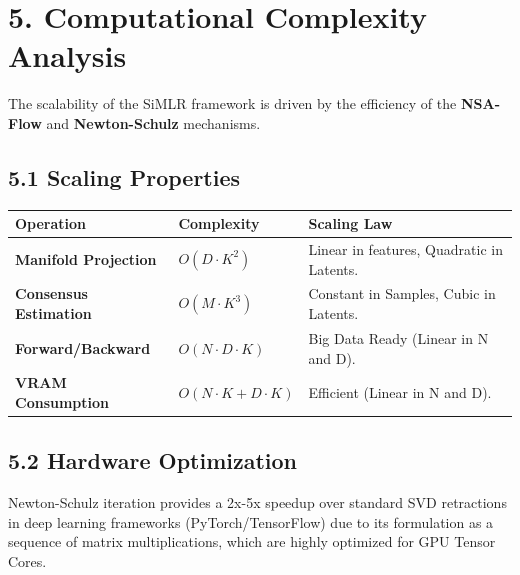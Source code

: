 \documentclass[
  letterpaper,
]{report}
\newcounter{none} %
\begin{document}
\section{5. Computational Complexity
Analysis}\label{computational-complexity-analysis}

The scalability of the SiMLR framework is driven by the efficiency of
the \textbf{NSA-Flow} and \textbf{Newton-Schulz} mechanisms.

\subsection{5.1 Scaling Properties}\label{scaling-properties}

{\def\LTcaptype{none} %
\begin{longtable}[]{@{}
  >{\raggedright\arraybackslash}p{}
  >{\raggedright\arraybackslash}p{}
  >{\raggedright\arraybackslash}p{}@{}}
\toprule\noalign{}
\begin{minipage}[b]{\linewidth}\raggedright
Operation
\end{minipage} & \begin{minipage}[b]{\linewidth}\raggedright
Complexity
\end{minipage} & \begin{minipage}[b]{\linewidth}\raggedright
Scaling Law
\end{minipage} \\
\midrule\noalign{}
\endhead
\bottomrule\noalign{}
\endlastfoot
\textbf{Manifold Projection} & \(O(D \cdot K^2)\) & Linear in features,
Quadratic in Latents. \\
\textbf{Consensus Estimation} & \(O(M \cdot K^3)\) & Constant in
Samples, Cubic in Latents. \\
\textbf{Forward/Backward} & \(O(N \cdot D \cdot K)\) & Big Data Ready
(Linear in N and D). \\
\textbf{VRAM Consumption} & \(O(N \cdot K + D \cdot K)\) & Efficient
(Linear in N and D). \\
\end{longtable}
}

\subsection{5.2 Hardware Optimization}\label{hardware-optimization}

Newton-Schulz iteration provides a 2x-5x speedup over standard SVD
retractions in deep learning frameworks (PyTorch/TensorFlow) due to its
formulation as a sequence of matrix multiplications, which are highly
optimized for GPU Tensor Cores.
\end{document}
